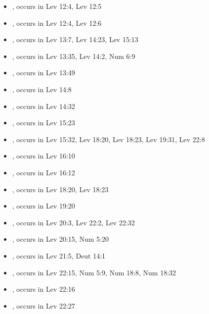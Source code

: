 \documentclass[14pt]{article}
\begin{document}
\begin{itemize}
\item {}, occurs in Lev 12:4, Lev 12:5

\item {}, occurs in Lev 12:4, Lev 12:6

\item {}, occurs in Lev 13:7, Lev 14:23, Lev 15:13

\item {}, occurs in Lev 13:35, Lev 14:2, Num 6:9

\item {}, occurs in Lev 13:49

\item {}, occurs in Lev 14:8

\item {}, occurs in Lev 14:32

\item {}, occurs in Lev 15:23

\item {}, occurs in Lev 15:32, Lev 18:20, Lev 18:23, Lev 19:31, Lev 22:8

\item {}, occurs in Lev 16:10

\item {}, occurs in Lev 16:12

\item {}, occurs in Lev 18:20, Lev 18:23

\item {}, occurs in Lev 19:20

\item {}, occurs in Lev 20:3, Lev 22:2, Lev 22:32

\item {}, occurs in Lev 20:15, Num 5:20

\item {}, occurs in Lev 21:5, Deut 14:1

\item {}, occurs in Lev 22:15, Num 5:9, Num 18:8, Num 18:32

\item {}, occurs in Lev 22:16

\item {}, occurs in Lev 22:27


\end{itemize}
\end{document}
